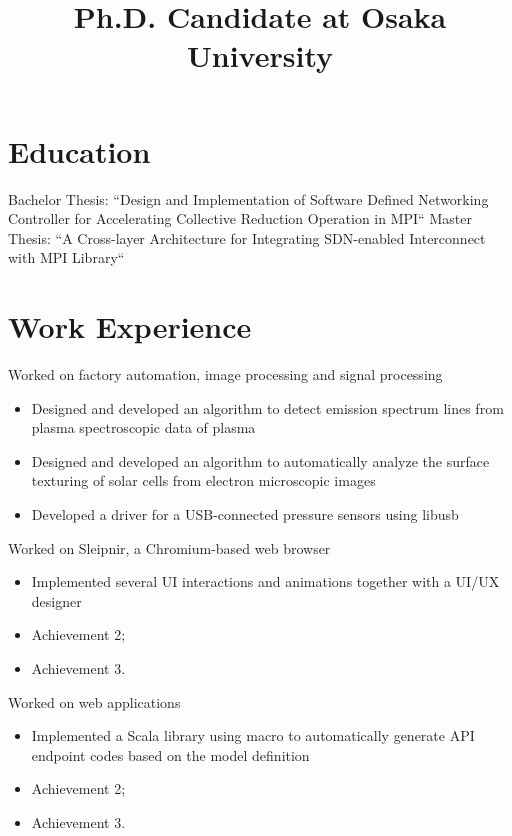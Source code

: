 \documentclass[11pt,a4paper,sans]{moderncv}
\title{Ph.D. Candidate at Osaka University}
\begin{document}
\makecvtitle

\section{Education}
%
{Bachelor Thesis: ``Design and Implementation of Software Defined Networking Controller for Accelerating Collective Reduction Operation in MPI``}
%
{Master Thesis: ``A Cross-layer Architecture for Integrating SDN-enabled Interconnect with MPI Library``}
%
{}

\section{Work Experience}

%
{Worked on factory automation, image processing and signal processing%
\begin{itemize}%
\item Designed and developed an algorithm to detect emission spectrum lines
    from plasma spectroscopic data of plasma
\item Designed and developed an algorithm to automatically analyze the
    surface texturing of solar cells from electron microscopic images
\item Developed a driver for a USB-connected pressure sensors using libusb
\end{itemize}}

%
{Worked on Sleipnir, a Chromium-based web browser%
\begin{itemize}%
\item Implemented several UI interactions and animations together with a UI/UX designer
\item Achievement 2;
\item Achievement 3.
\end{itemize}}

%
{Worked on web applications%
\begin{itemize}%
\item Implemented a Scala library using macro to automatically generate API
    endpoint codes based on the model definition
\item Achievement 2;
\item Achievement 3.
\end{itemize}}
\end{document}
